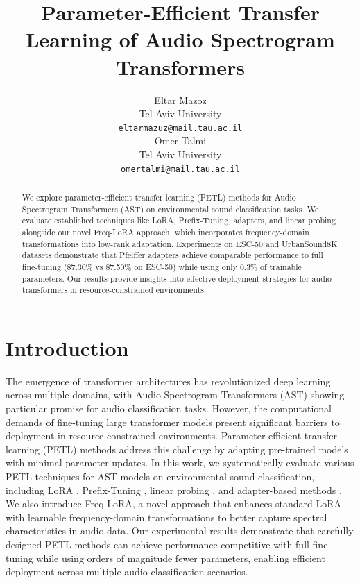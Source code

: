 \documentclass[11pt]{article}
\title{Parameter-Efficient Transfer Learning of Audio Spectrogram Transformers}
\author{Eltar Mazoz \\
  Tel Aviv University \\
  \texttt{eltarmazuz@mail.tau.ac.il} \\\And
  Omer Talmi \\
  Tel Aviv University \\
  \texttt{omertalmi@mail.tau.ac.il} \\}
\begin{document}
\maketitle
\begin{abstract}
We explore parameter-efficient transfer learning (PETL) methods for Audio Spectrogram Transformers (AST) on environmental sound classification tasks. We evaluate established techniques like LoRA, Prefix-Tuning, adapters, and linear probing alongside our novel Freq-LoRA approach, which incorporates frequency-domain transformations into low-rank adaptation. Experiments on ESC-50 and UrbanSound8K datasets demonstrate that Pfeiffer adapters achieve comparable performance to full fine-tuning (87.30\% vs 87.50\% on ESC-50) while using only 0.3\% of trainable parameters. Our results provide insights into effective deployment strategies for audio transformers in resource-constrained environments.
\end{abstract}

\section{Introduction}
The emergence of transformer architectures has revolutionized deep learning across multiple domains, with Audio Spectrogram Transformers (AST) showing particular promise for audio classification tasks. However, the computational demands of fine-tuning large transformer models present significant barriers to deployment in resource-constrained environments. Parameter-efficient transfer learning (PETL) methods address this challenge by adapting pre-trained models with minimal parameter updates. In this work, we systematically evaluate various PETL techniques for AST models on environmental sound classification, including LoRA \cite{hu2021lora}, Prefix-Tuning \cite{li2021prefix}, linear probing \cite{kumar2022finetuning}, and adapter-based methods \cite{he2021towards}. We also introduce Freq-LoRA, a novel approach that enhances standard LoRA with learnable frequency-domain transformations to better capture spectral characteristics in audio data. Our experimental results demonstrate that carefully designed PETL methods can achieve performance competitive with full fine-tuning while using orders of magnitude fewer parameters, enabling efficient deployment across multiple audio classification scenarios.
\end{document}
